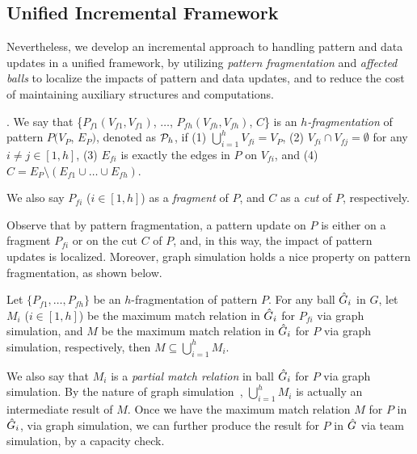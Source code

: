 \subsection{Unified Incremental Framework}

Nevertheless, we develop an incremental approach to handling pattern and data updates in a unified framework, by utilizing {\em pattern fragmentation} and {\em affected balls} to localize the impacts of pattern and data updates, and to reduce the cost of maintaining auxiliary structures and computations.


. 
We say that \{$P_{f1}(V_{f1},V_{f1})$, $\ldots$, $P_{fh}(V_{fh},V_{fh})$, $C$\} is an {\em $h$-fragmentation} of pattern $P(V_{P}$, $E_{P})$, denoted as ${\cal P}_{h}$,
if (1) $\bigcup_{i=1}^{h}V_{fi}=V_{P}$, (2) $V_{fi}\cap V_{fj} = \emptyset$ for any $i\ne j\in[1, h]$,
(3) $E_{fi}$ is exactly the edges in $P$ on $V_{fi}$, and (4) $C=E_P \setminus (E_{f1}\cup\ldots\cup E_{fh})$.

We also say $P_{fi}$ ($i\in[1,h]$) as a {\em fragment} of $P$, and $C$ as a {\em cut} of $P$, respectively.

Observe that by pattern fragmentation, a pattern update on $P$ is either on a fragment $P_{fi}$ or on the cut $C$ of $P$, and, in this way, the impact of pattern updates is localized. Moreover, graph simulation holds a nice property on pattern fragmentation, as shown below.

\vspace{-0.5ex}
\begin{theorem}
\label{thm-compose}
Let $\{P_{f1},\ldots,P_{fh}\}$ be an $h$-fragmentation of pattern $P$.
For any ball $\hat{G}{}_i$ in $G$, let $M_i$ ($i\in[1,h]$) be the maximum match relation in $\hat{G}{}_i$ for $P_{fi}$ via graph simulation,
and $M$ be the maximum match relation in $\hat{G}{}_i$ for $P$ via graph simulation, respectively,
then $M\subseteq\bigcup_{i=1}^{h}M_{i}$.
\end{theorem}

We also say that $M_i$ is a {\em partial match relation} in ball $\hat{G}{}_i$ for $P$ via graph simulation.
By the nature of graph simulation~\cite{infsimu95}, $\bigcup_{i=1}^{h}M_{i}$ is actually an intermediate result of $M$.
Once we have the maximum match relation $M$ for $P$ in $\hat{G}{}_i$, via graph simulation, we can further produce the result for $P$ in  $\hat{G}{}$ via team simulation, by a capacity check.

